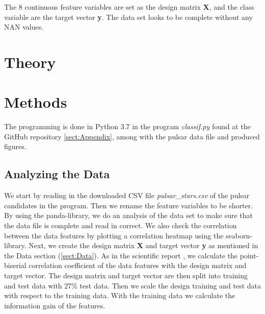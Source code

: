 \documentclass[12pt,a4paper,english]{article}
\begin{document}
The 8 continuous feature variables are set as the design matrix \textbf{X}, and the class variable are the target vector \textbf{y}. The data set looks to be complete without any NAN values.

\section{Theory}
\label{sect:Theory}
\section{Methods}
\label{sect:Methods}
The programming is done in Python 3.7 in the program \textit{classif.py} found at the GitHub repository \ref{sect:Appendix}, among with the pulsar data file and produced figures.
\subsection{Analyzing the Data}
\label{subsect:analysis}
We start by reading in the downloaded CSV file \textit{pulsar\_stars.csv} of the pulsar candidates in the program. Then we rename the feature variables to be shorter. By using the panda-library, we do an analysis of the data set to make sure that the data file is complete and read in correct. We also check the correlation between the data features by plotting a correlation heatmap using the seaborn-library. Next, we create the design matrix \textbf{X} and target vector \textbf{y} as mentioned in the Data section (\ref{sect:Data}). As in the scientific report \cite{pulsar_art}, we calculate the point-biserial correlation coefficient of the data features with the design matrix and target vector. The design matrix and target vector are then split into training and test data with 27\% test data. Then we scale the design training and test data with respect to the training data. With the training data we calculate the information gain of the features.
\end{document}
